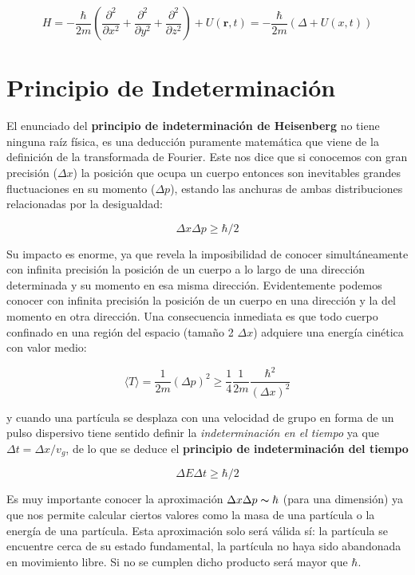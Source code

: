 \documentclass[12pt]{article}
\newcommand{\parentesis}[1]{\left( #1  \right)}
\newcommand{\parciales}[2]{\frac{\partial #1}{\partial #2}}
\newcommand{\rn}{\mathbf{r}}
\begin{document}
\begin{equation}
H = - \dfrac{\hbar}{2m} \parentesis{\parciales{^2}{x^2}+\parciales{^2}{y^2}+ \parciales{^2}{z^2}} + U(\rn,t) = - \dfrac{\hbar}{2m}(\Delta + U(x,t))
\end{equation}


\section{Principio de Indeterminación}

El enunciado del \textbf{principio de indeterminación de Heisenberg} no tiene ninguna raíz física, es una deducción puramente matemática que viene de la definición de la transformada de Fourier. Este nos dice que si conocemos con gran precisión ($\Delta x$) la posición que ocupa un cuerpo entonces son inevitables grandes fluctuaciones en su momento ($\Delta p$), estando las anchuras de ambas distribuciones  relacionadas por la desigualdad:

\begin{equation}
\Delta x \Delta p \geq \hbar/2
\end{equation}

Su impacto es enorme, ya que revela la imposibilidad de conocer simultáneamente con infinita precisión la posición de un cuerpo a lo largo de una dirección determinada y su momento en esa misma dirección. Evidentemente podemos conocer con infinita precisión la posición de un cuerpo en una dirección y la del momento en otra dirección. Una consecuencia inmediata es que todo cuerpo confinado en una región del espacio (tamaño 2 $\Delta x$) adquiere una energía cinética con valor medio:

\begin{equation}
\langle T \rangle = \dfrac{1}{2 m} (\Delta p)^2 \geq \dfrac{1}{4} \dfrac{1}{2m} \dfrac{\hbar^2}{(\Delta x)^2}
\end{equation}

y cuando una partícula se desplaza con una velocidad de grupo en forma de un pulso dispersivo tiene sentido definir la \textit{indeterminación en el tiempo} ya que $\Delta t = \Delta x/ v_g$, de lo que se deduce el \textbf{principio de indeterminación del tiempo}

\begin{equation}
\Delta E \Delta t \geq \hbar / 2
\end{equation}


Es muy importante conocer la aproximación $\Delta x \Delta p \thicksim \hbar$ (para una dimensión) ya que nos permite calcular ciertos valores como la masa de una partícula o la energía de una partícula. Esta aproximación solo será válida sí: la partícula se encuentre cerca de su estado fundamental, la partícula no haya sido abandonada en movimiento libre. Si no se cumplen dicho producto será mayor que $\hbar$. \\
\end{document}
